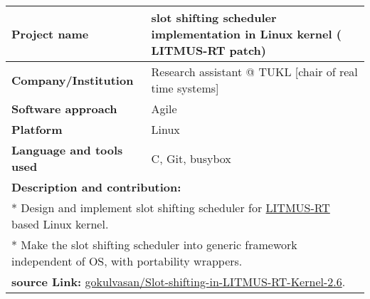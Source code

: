 \documentclass[letterpaper]{twentysecondcv} %
\begin{document}
 \begin{tabular}{ |p{7cm}|p{13cm}| }
 \hline
\rowcolor{sidecolor} 
\textbf{{\large Project name}} & \textbf{slot shifting scheduler implementation in Linux kernel ( LITMUS-RT patch)}\\[2ex]
 \hline
\rowcolor{sidecolor}
\textbf{{\large Company/Institution}} & Research assistant @ TUKL [chair of real time systems]\\[2ex]
 \hline
 \textbf{{\large Software approach}} & Agile \\[2ex]
 \hline
 \textbf{{\large Platform}} & Linux \\[2ex]
 \hline
  \textbf{{\large Language and tools used}} & C, Git, busybox \\[2ex]
 \hline
 
 \multicolumn{2}{l}{
 \textbf{\large Description and contribution:}} \\[2ex]
 \multicolumn{2}{l}{
 	* Design and implement slot shifting scheduler for \href{http://www.litmus-rt.org/}{\textcolor{materialindigo}{LITMUS-RT}} based Linux kernel.}\\
 \multicolumn{2}{l}{
 	* Make the slot shifting scheduler into generic framework independent of OS, with portability wrappers.}\\
 \multicolumn{2}{l}{
 	{\textcolor{yt} \faGlobe} \textbf{source Link:} \href{https://github.com/gokulvasan/Slot-shifting-in-LITMUS-RT-Kernel-2.6}{gokulvasan/Slot-shifting-in-LITMUS-RT-Kernel-2.6}.
 }\\
 \hline
 \hline
 \end{tabular}
 
 \vspace{6mm}
 
\end{document}
